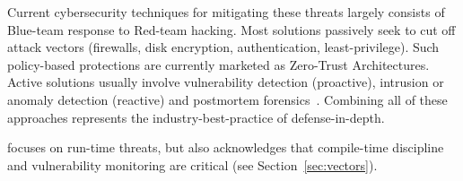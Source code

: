Current cybersecurity techniques for mitigating these threats largely consists of Blue-team response to Red-team hacking.
Most solutions passively seek to cut off attack vectors (firewalls, disk encryption, authentication, least-privilege).
Such policy-based protections are currently marketed as Zero-Trust Architectures.
Active solutions usually involve vulnerability detection (proactive), intrusion or anomaly detection (reactive) and postmortem forensics~\cite{anderson2020security, brooks2018cybersecurity, wittkop2022cybersecurity}.
Combining all of these approaches represents the industry-best-practice of defense-in-depth.

\projectName focuses on run-time threats, but also acknowledges that compile-time discipline and vulnerability monitoring are critical (see Section~\ref{sec:vectors}).